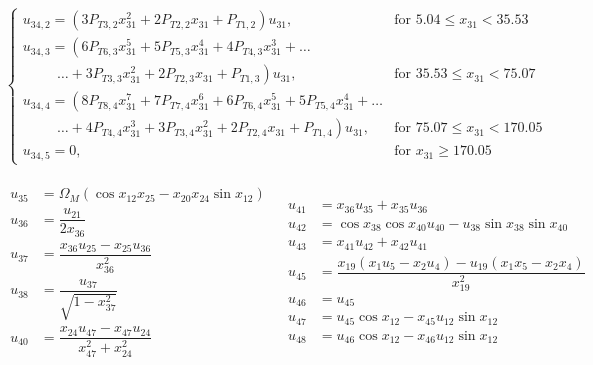 \begin{equation}
\begin{split}
\begin{cases}
u_{34,2}=\left(3P_{T 3,2}x_{31}^{2}+2P_{T 2,2}x_{31}+P_{T 1,2}\right)u_{31}, &  \text{for } 5.04\leq x_{31} < 35.53   \\
u_{34,3}=\left(6 P_{T 6,3}x_{31}^{5}+5P_{T 5,3}x_{31}^{4}+4P_{T 4,3}x_{31}^{3}+\dots \right. \\
\qquad \ \  \left. \dotsc +3P_{T 3,3}x_{31}^{2}+2P_{T 2,3}x_{31}+P_{T 1,3}\right)u_{31}, &  \text{for } 35.53\leq x_{31} < 75.07   \\
u_{34,4}=\left(8 P_{T 8,4}x_{31}^{7}+7P_{T 7,4}x_{31}^{6}+6P_{T 6,4}x_{31}^{5}+5P_{T 5,4}x_{31}^{4} + \dots \right. \\
\qquad \ \  \left. \dotsc +4P_{T 4,4}x_{31}^{3}+3P_{T 3,4}x_{31}^{2}+2P_{T 2,4}x_{31}+P_{T 1,4}\right)u_{31}, &  \text{for } 75.07\leq x_{31} < 170.05   \\
u_{34,5}=0, &  \text{for }  x_{31} \geq 170.05   
\end{cases}
\end{split}
\end{equation}

\begin{align} \label{eq:unAuxEq3}
\begin{split}
u_{35} &=  \Omega_{M}\left(\cos x_{12}x_{25}-x_{20}x_{24}\sin x_{12}\right) \\
u_{36} &=  \dfrac{u_{21}}{2x_{36}} \\
u_{37} &= \dfrac{x_{36}u_{25}-x_{25}u_{36}}{x_{36}^{2}} \\
u_{38} &= \dfrac{u_{37}}{\sqrt{1-x_{37}^{2}}} \\ 
u_{40} &=  \dfrac{x_{24}u_{47}-x_{47}u_{24}}{x_{47}^{2}+x_{24}^{2}}\\
\end{split}
&
\begin{split}
u_{41} &= x_{36}u_{35}+x_{35}u_{36}\\ 
u_{42} &= \cos x_{38} \cos x_{40} u_{40}-u_{38} \sin x_{38} \sin x_{40}\\
u_{43} &= x_{41}u_{42}+x_{42}u_{41} \\ 
u_{45} &= \dfrac{x_{19}\left(x_{1}u_{5}-x_{2}u_{4}\right)-u_{19}\left(x_{1}x_{5}-x_{2}x_{4}\right)}{x_{19}^{2}}\\
u_{46} &= u_{45} \\
u_{47} &= u_{45}\cos x_{12} - x_{45}u_{12}\sin x_{12} \\
u_{48} &= u_{46}\cos x_{12} - x_{46}u_{12}\sin x_{12} \\
\end{split}
\end{align}

